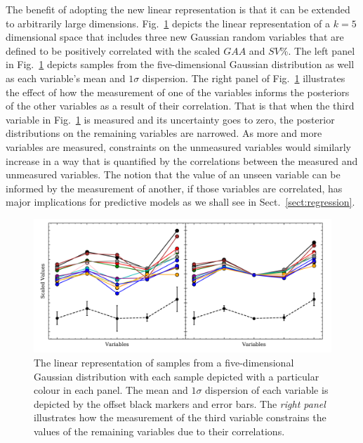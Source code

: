 The benefit of adopting the new linear representation is that it can be extended to
arbitrarily large dimensions. Fig.~\ref{fig:linrepv2} depicts the linear representation
of a $k=5$ dimensional space that includes three new Gaussian random variables that
are defined to be positively correlated with the scaled $GAA$ and $SV$\%. The left panel
in Fig.~\ref{fig:linrepv2} depicts samples from the five-dimensional Gaussian distribution
as well as each variable's mean and $1\sigma$ dispersion. The right panel of
Fig.~\ref{fig:linrepv2} illustrates the effect of how the measurement of one of the variables
informs the posteriors of the other variables as a result of their correlation. That is
that when the third variable in Fig.~\ref{fig:linrepv2} is measured and its uncertainty
goes to zero, the posterior distributions on the remaining variables are narrowed. As
more and more variables are measured, constraints on the unmeasured variables would
similarly increase in a way that is quantified by the correlations between the
measured and unmeasured variables.
The notion that the value of an unseen variable can be informed by the measurement
of another, if those variables are correlated, has major implications for
predictive models as we shall see in Sect.~\ref{sect:regression}. \\

\begin{figure}
  \centering
  \includegraphics[width=\hsize]{figures/linearrep_v2.png}
  \caption[Linear representation of Gaussian random variables in five dimensions.]
          {The linear representation of samples from a five-dimensional Gaussian
            distribution with each sample depicted with a particular colour in each
            panel. The mean and $1\sigma$ dispersion of each variable is depicted
            by the offset black markers and error bars. The \emph{right panel} illustrates
            how the measurement of the third variable constrains the values of the
            remaining variables due to their correlations.}
  \label{fig:linrepv2}
\end{figure}


